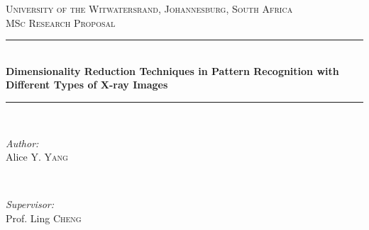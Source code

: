 \documentclass[11pt]{article}
\begin{document}
	\begin{titlepage}
		
		\newcommand{\HRule}{\rule{\linewidth}{0.5mm}} %
		
		\center %
		
		
		\textsc{\LARGE University of the Witwatersrand, Johannesburg, South Africa}\\[1.5cm] %
		\textsc{\large MSc Research Proposal}\\[0.5cm] %
		
		
		\HRule \\[0.4cm]
		{ \huge \bfseries Dimensionality Reduction Techniques in Pattern Recognition with Different Types of X-ray Images}\\[0.4cm] %
		\HRule \\[1.5cm]
		
		
		\begin{minipage}{0.4\textwidth}
			\begin{flushleft} \large
				\emph{Author:}\\
				Alice Y. \textsc{Yang} %
			\end{flushleft}
		\end{minipage}
		~
		\begin{minipage}{0.4\textwidth}
			\begin{flushright} \large
				\emph{Supervisor:} \\
				Prof. Ling \textsc{Cheng} \\ %
			\end{flushright}
		\end{minipage}\\[2cm]
		

\end{titlepage}
\end{document}
